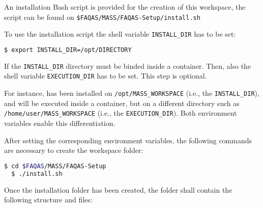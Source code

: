 An installation Bash script is provided for the creation of this workspace, the script can be found on \texttt{\$FAQAS/MASS/FAQAS-Setup/install.sh}

To use the installation script the shell variable \texttt{INSTALL\_DIR} has to be set:

\begin{lstlisting}[language=bash]
  $ export INSTALL_DIR=/opt/DIRECTORY
\end{lstlisting}

If the \texttt{INSTALL\_DIR} directory must be binded inside a container. Then, also the shell variable \texttt{EXECUTION\_DIR} has to be set. This step is optional.

For instance, \MASS has been installed on \texttt{/opt/MASS\_WORKSPACE} (i.e., the \texttt{INSTALL\_DIR}), and \MASS will be executed inside a container, but on a different directory such as \\\texttt{/home/user/MASS\_WORKSPACE} (i.e., the \texttt{EXECUTION\_DIR}). Both environment variables enable this differentiation.


After setting the corresponding environment variables, the following commands are necessary to create the \MASS workspace folder:

\begin{lstlisting}[language=bash]
  $ cd $FAQAS/MASS/FAQAS-Setup
  $ ./install.sh
\end{lstlisting}

Once the installation folder has been created, the folder shall contain the following structure and files:

